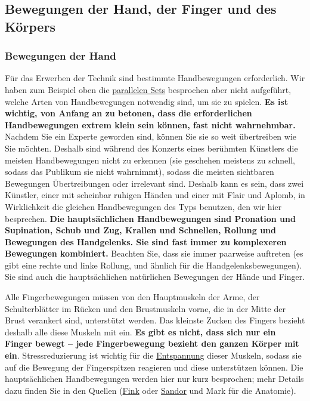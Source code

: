 
\subsection{Bewegungen der Hand, der Finger und des Körpers}
\label{c1iii4}

\subsubsection{Bewegungen der Hand}

Für das Erwerben der Technik sind bestimmte Handbewegungen erforderlich.
Wir haben zum Beispiel oben die \hyperref[c1ii11]{parallelen Sets} besprochen aber nicht aufgeführt, welche Arten von Handbewegungen notwendig sind, um sie zu spielen.
\textbf{Es ist wichtig, von Anfang an zu betonen, dass die erforderlichen Handbewegungen extrem klein sein können, fast nicht wahrnehmbar.}
Nachdem Sie ein Experte geworden sind, können Sie sie so weit übertreiben wie Sie möchten.
Deshalb sind während des Konzerts eines berühmten Künstlers die meisten Handbewegungen nicht zu erkennen (sie geschehen meistens zu schnell, sodass das Publikum sie nicht wahrnimmt), sodass die meisten sichtbaren Bewegungen Übertreibungen oder irrelevant sind.
Deshalb kann es sein, dass zwei Künstler, einer mit scheinbar ruhigen Händen und einer mit Flair und Aplomb, in Wirklichkeit die gleichen Handbewegungen des Typs benutzen, den wir hier besprechen.
\textbf{Die hauptsächlichen Handbewegungen sind Pronation und Supination, Schub und Zug, Krallen und Schnellen, Rollung und Bewegungen des Handgelenks.
Sie sind fast immer zu komplexeren Bewegungen kombiniert.}
Beachten Sie, dass sie immer paarweise auftreten (es gibt eine rechte und linke Rollung, und ähnlich für die Handgelenksbewegungen).
Sie sind auch die hauptsächlichen natürlichen Bewegungen der Hände und Finger.

Alle Fingerbewegungen müssen von den Hauptmuskeln der Arme, der Schulterblätter im Rücken und den Brustmuskeln vorne, die in der Mitte der Brust verankert sind, unterstützt werden.
Das kleinste Zucken des Fingers bezieht deshalb alle diese Muskeln mit ein.
\textbf{Es gibt es nicht, dass sich nur ein Finger bewegt -- jede Fingerbewegung bezieht den ganzen Körper mit ein}.
Stressreduzierung ist wichtig für die \hyperref[c1ii14]{Entspannung} dieser Muskeln, sodass sie auf die Bewegung der Fingerspitzen reagieren und diese unterstützen können.
Die hauptsächlichen Handbewegungen werden hier nur kurz besprochen; mehr Details dazu finden Sie in den Quellen (\hyperref[Fink]{Fink} oder \hyperref[Sandor]{Sandor} und Mark für die Anatomie).


